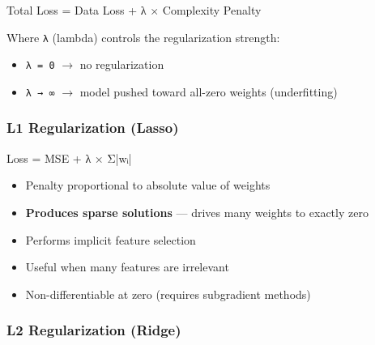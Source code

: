 \documentclass[11pt]{article}
\providecommand{\tightlist}{\setlength{\itemsep}{1pt}\setlength{\parskip}{0pt}}
\newenvironment{Shaded}{\begin{snugshade}}{\end{snugshade}}
\newcommand{\NormalTok}[1]{\textcolor[rgb]{0.81,0.81,0.76}{#1}}
\newcommand{\OperatorTok}[1]{\textcolor[rgb]{0.81,0.81,0.76}{#1}}
\begin{document}

\begin{Shaded}
\begin{Highlighting}[]
\NormalTok{Total Loss }\OperatorTok{=}\NormalTok{ Data Loss }\OperatorTok{+}\NormalTok{ λ × Complexity Penalty}
\end{Highlighting}
\end{Shaded}

Where \texttt{λ} (lambda) controls the regularization strength:

\begin{itemize}
\tightlist
\item
  \texttt{λ\ =\ 0} \(\rightarrow\) no regularization
\item
  \texttt{λ\ →\ ∞} \(\rightarrow\) model pushed toward all-zero weights (underfitting)
\end{itemize}

\subsubsection{L1 Regularization (Lasso)}\label{l1-regularization-lasso}


\begin{Shaded}
\begin{Highlighting}[]
\NormalTok{Loss }\OperatorTok{=}\NormalTok{ MSE }\OperatorTok{+}\NormalTok{ λ × Σ}\OperatorTok{|}\NormalTok{wᵢ}\OperatorTok{|}
\end{Highlighting}
\end{Shaded}

\begin{itemize}
\tightlist
\item
  Penalty proportional to absolute value of weights
\item
  \textbf{Produces sparse solutions} --- drives many weights to exactly zero
\item
  Performs implicit feature selection
\item
  Useful when many features are irrelevant
\item
  Non-differentiable at zero (requires subgradient methods)
\end{itemize}

\subsubsection{L2 Regularization (Ridge)}\label{l2-regularization-ridge}
\end{document}
